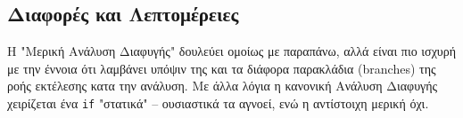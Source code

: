 \subsection{Διαφορές και Λεπτομέρειες}


Η "Μερική Ανάλυση Διαφυγής" δουλεύει ομοίως με παραπάνω, αλλά είναι πιο  ισχυρή
με την έννοια ότι λαμβάνει υπόψιν της και τα διάφορα παρακλάδια (branches) της
ροής εκτέλεσης κατα την ανάλυση. Με άλλα λόγια η κανονική Ανάλυση Διαφυγής
χειρίζεται ένα \texttt{if} "στατικά" – ουσιαστικά τα αγνοεί, ενώ η αντίστοιχη
μερική όχι.

